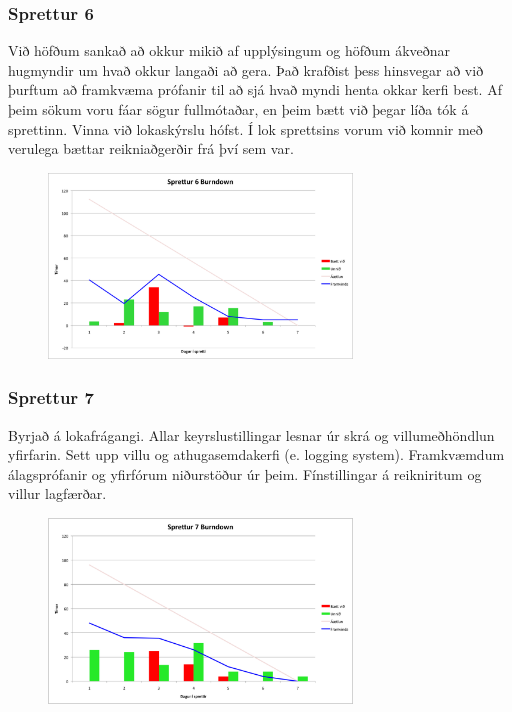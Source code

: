 \documentclass{article}
\begin{document}
\subsubsection{Sprettur 6}
Við höfðum sankað að okkur mikið af upplýsingum og höfðum ákveðnar hugmyndir um
hvað okkur langaði að gera. Það krafðist þess hinsvegar að við 
þurftum að framkvæma prófanir til að sjá hvað myndi henta okkar kerfi best. 
Af þeim sökum voru fáar sögur fullmótaðar, en þeim bætt við þegar líða tók á sprettinn.
Vinna við lokaskýrslu hófst. Í lok sprettsins vorum við komnir með verulega bættar reikniaðgerðir frá því sem var.

\begin{figure}[H]
 \centering
 \includegraphics[width=0.72\textwidth]{Sprettur6_Burndown.png}
 \caption{}
\label{fig:sp6}
\end{figure}

\subsubsection{Sprettur 7}
Byrjað á lokafrágangi. Allar keyrslustillingar lesnar úr skrá og villumeðhöndlun
yfirfarin. Sett upp villu og athugasemdakerfi (e. logging system). Framkvæmdum álagsprófanir og 
yfirfórum niðurstöður úr þeim. Fínstillingar á reikniritum og villur lagfærðar. 

\begin{figure}[H]
 \centering
 \includegraphics[width=0.72\textwidth]{Sprettur7_Burndown.png}
 \caption{}
\label{fig:sp7}
\end{figure}
\end{document}
